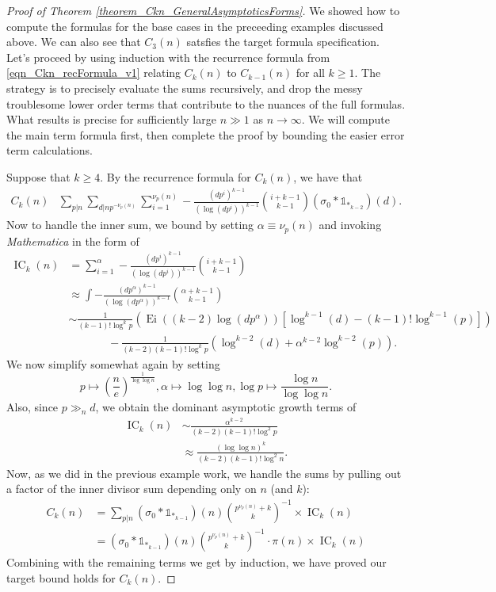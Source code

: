 \documentclass[11pt,reqno,a4letter]{article}
\numberwithin{figure}{section}
\numberwithin{table}{section}
\theoremstyle{plain}
\numberwithin{theorem}{section}
\theoremstyle{definition}
\begin{document}
\begin{proof}[Proof of Theorem \ref{theorem_Ckn_GeneralAsymptoticsForms}] 
We showed how to compute the formulas for the base cases in the preceeding examples 
discussed above. We can also see that $C_3(n)$ satsfies the target formula specification. 
Let's proceed by using induction with the recurrence formula from 
\eqref{eqn_Ckn_recFormula_v1} 
relating $C_k(n)$ to $C_{k-1}(n)$ for all $k \geq 1$. The strategy is to 
precisely evaluate the sums recursively, and drop the messy troublesome lower order 
terms that contribute to the nuances of the full formulas. What results is 
precise for sufficiently large $n \gg 1$ as $n \rightarrow \infty$. 
We will compute the main term formula first, then complete the proof 
by bounding the easier error term calculations. 

Suppose that $k \geq 4$. By the recurrence formula for $C_k(n)$, we have that 
\begin{align*} 
C_k(n) & \sum_{p|n} \sum_{d|np^{-\nu_p(n)}} \sum_{i=1}^{\nu_p(n)} -\frac{(dp^i)^{k-1}}{(\log(dp^i))^{k-1}} 
     \binom{i+k-1}{k-1} (\sigma_0 \ast \mathds{1}_{\ast_{k-2}})(d). 
\end{align*} 
Now to handle the inner sum, we bound by setting $\alpha \equiv \nu_p(n)$ and 
invoking \emph{Mathematica} in the form of 
\begin{align*} 
\operatorname{IC}_k(n) & = \sum_{i=1}^{\alpha} -\frac{(dp^i)^{k-1}}{(\log(dp^i))^{k-1}} 
     \binom{i+k-1}{k-1} \\ 
     & \approx \int -\frac{(dp^{\alpha})^{k-1}}{(\log(dp^{\alpha}))^{k-1}} 
     \binom{\alpha+k-1}{k-1} \\ 
     & \sim \frac{1}{(k-1)! \log^k p} \left( 
     \operatorname{Ei}((k-2) \log(dp^{\alpha})) \left[
     \log^{k-1}(d) - (k-1)! \log^{k-1}(p)\right] 
     \right) \\ 
     & \phantom{\approx\qquad\ } - 
     \frac{1}{(k-2) (k-1)! \log^k p} \left( 
     \log^{k-2}(d) + \alpha^{k-2} \log^{k-2}(p) 
     \right). 
\end{align*} 
We now simplify somewhat again by setting
$$p \mapsto \left(\frac{n}{e}\right)^{\frac{1}{\log\log n}}, \alpha \mapsto \log\log n, 
  \log p \mapsto \frac{\log n}{\log\log n}.$$ 
Also, since $p \gg_{n} d$, we obtain the dominant asymptotic growth terms of 
\begin{align*} 
\operatorname{IC}_k(n) & \sim \frac{\alpha^{k-2}}{(k-2) (k-1)! \log^2 p} \\ 
     & \approx \frac{(\log\log n)^k}{(k-2) (k-1)! \log^2 n}. 
\end{align*} 
Now, as we did in the previous example work, we handle the sums by pulling out a factor of the inner 
divisor sum depending only on $n$ (and $k$): 
\begin{align*} 
C_k(n) & = \sum_{p|n} (\sigma_0 \ast \mathds{1}_{\ast_{k-1}})(n) 
     \binom{p^{\nu_p(n)} + k}{k}^{-1} \times \operatorname{IC}_k(n) \\ 
     & = (\sigma_0 \ast \mathds{1}_{\ast_{k-1}})(n) 
     \binom{p^{\nu_p(n)} + k}{k}^{-1} \cdot \pi(n) \times \operatorname{IC}_k(n)
\end{align*} 
Combining with the remaining terms we get by induction, we have proved our target bound holds 
for $C_k(n)$. 


\end{proof}
\end{document}
